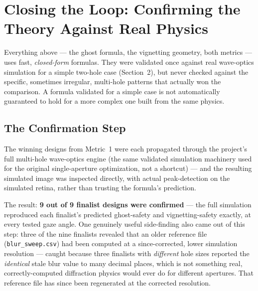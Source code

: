 \section{Closing the Loop: Confirming the Theory Against Real Physics}

Everything above --- the ghost formula, the vignetting geometry, both
metrics --- uses fast, \emph{closed-form} formulas. They were validated once
against real wave-optics simulation for a simple two-hole case
(Section~2), but never checked against the specific, sometimes irregular,
multi-hole patterns that actually won the comparison. A formula validated
for a simple case is not automatically guaranteed to hold for a more
complex one built from the same physics.

\subsection{The Confirmation Step}

The winning designs from Metric~1 were each propagated through the
project's full multi-hole wave-optics engine (the same validated
simulation machinery used for the original single-aperture optimization,
not a shortcut) --- and the resulting simulated image was inspected
directly, with actual peak-detection on the simulated retina, rather than
trusting the formula's prediction.

The result: \textbf{9 out of 9 finalist designs were confirmed} --- the
full simulation reproduced each finalist's predicted ghost-safety and
vignetting-safety exactly, at every tested gaze angle. One genuinely useful
side-finding also came out of this step: three of the nine finalists
revealed that an older reference file (\texttt{blur\_sweep.csv}) had been
computed at a since-corrected, lower simulation resolution --- caught
because three finalists with \emph{different} hole sizes reported the
\emph{identical} stale blur value to many decimal places, which is not
something real, correctly-computed diffraction physics would ever do for
different apertures. That reference file has since been regenerated at
the corrected resolution.

